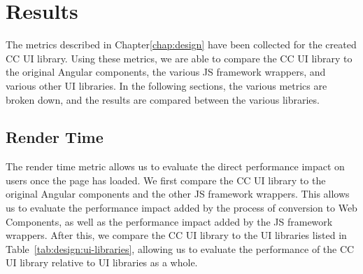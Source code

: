 \chapter{Results}\label{chap:results}
The metrics described in Chapter\ref{chap:design} have been collected for the created CC UI library. Using these metrics, we are able to compare the CC UI library to the original Angular components, the various JS framework wrappers, and various other UI libraries. In the following sections, the various metrics are broken down, and the results are compared between the various libraries.

\section{Render Time}
The render time metric allows us to evaluate the direct performance impact on users once the page has loaded. We first compare the CC UI library to the original Angular components and the other JS framework wrappers. This allows us to evaluate the performance impact added by the process of conversion to Web Components, as well as the performance impact added by the JS framework wrappers. After this, we compare the CC UI library to the UI libraries listed in Table~\ref{tab:design:ui-libraries}, allowing us to evaluate the performance of the CC UI library relative to UI libraries as a whole.


